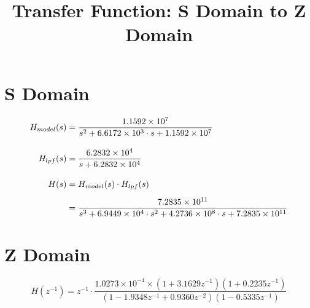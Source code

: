 \documentclass[12pt,a4paper]{article}
\title{Transfer Function: S Domain to Z Domain}
\author{}
\date{}
\begin{document}
\maketitle

\section{S Domain}

\begin{align}
H_{model}(s) &= \frac{1.1592 \times 10^7}{s^2 + 6.6172 \times 10^3 \cdot s + 1.1592 \times 10^7} \\[10pt]
H_{lpf}(s) &= \frac{6.2832 \times 10^4}{s + 6.2832 \times 10^4} \\[10pt]
H(s) &= H_{model}(s) \cdot H_{lpf}(s) \notag \\[5pt]
&= \frac{7.2835 \times 10^{11}}{s^3 + 6.9449 \times 10^4 \cdot s^2 + 4.2736 \times 10^8 \cdot s + 7.2835 \times 10^{11}}
\end{align}

\section{Z Domain}

\begin{equation}
H(z^{-1}) = z^{-1} \cdot \frac{1.0273 \times 10^{-4} \times (1 + 3.1629 z^{-1})(1 + 0.2235 z^{-1})}{(1 - 1.9348 z^{-1} + 0.9360 z^{-2})(1 - 0.5335 z^{-1})}
\end{equation}
\end{document}
